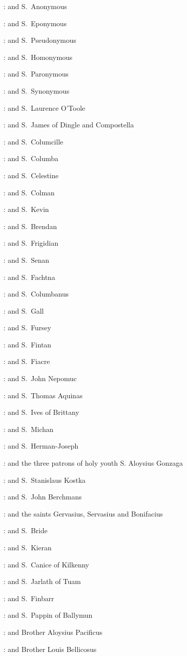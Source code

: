 :
and S.~Anonymous

:
and S.~Eponymous

:
and S.~Pseudonymous

:
and S.~Homonymous

:
and S.~Paronymous

:
and S.~Synonymous

:
and S.~Laurence O'Toole

:
and S.~James of Dingle and Compostella

:
and S.~Columcille

:
and S.~Columba

:
and S.~Celestine

:
and S.~Colman

:
and S.~Kevin

:
and S.~Brendan

:
and S.~Frigidian

:
and S.~Senan

:
and S.~Fachtna

:
and S.~Columbanus

:
and S.~Gall

:
and S.~Fursey

:
and S.~Fintan

:
and S.~Fiacre

:
and S.~John Nepomuc

:
and S.~Thomas Aquinas

:
and S.~Ives of Brittany

:
and S.~Michan

:
and S.~Herman-Joseph

:
and the three patrons of holy youth
S. Aloysius Gonzaga

:
and S.~Stanislaus Kostka

:
and S.~John Berchmans

:
and the saints Gervasius,
Servasius
and Bonifacius

:
and S.~Bride

:
and S.~Kieran

:
and S.~Canice of Kilkenny

:
and S.~Jarlath of Tuam

:
and S.~Finbarr

:
and S.~Pappin of Ballymun

:
and Brother Aloysius Pacificus

:
and Brother Louis Bellicosus

